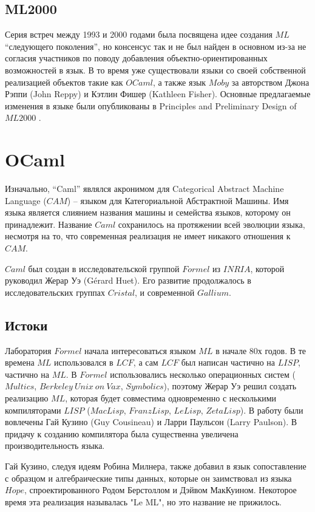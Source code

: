 \documentclass[14pt]{matmex-diploma-custom}
\begin{document}
\subsection{ML2000}
Серия встреч между 1993 и 2000 годами была посвящена идее создания $M\!L$ “следующего поколения”, но консенсус так и не был найден в основном из-за не согласия участников по поводу добавления объектно-ориентированных возможностей в язык. В то время уже существовали языки со своей собственной реализацией объектов такие как $OCaml$, а также язык $Moby$ за авторством Джона Рэппи (John Reppy) и Кэтлин Фишер (Kathleen Fisher). Основные предлагаемые изменения в языке были опубликованы в Principles and Preliminary Design of $ML2000$ \cite{ML2000}. 


\section{OCaml}
Изначально, “Caml” являлся акронимом для Categorical Abstract Machine Language ($CAM$) -- языком для Категориальной Абстрактной Машины. Имя языка является слиянием названия машины и семейства языков, которому он принадлежит. Название $Caml$ сохранилось на протяжении всей эволюции языка, несмотря на то, что современная реализация не имеет никакого отношения к $CAM$.

$Caml$ был создан в исследовательской группой $Formel$ из $INRIA$, которой руководил Жерар Уэ (Gérard Huet). Его развитие продолжалось в исследовательских группах $Cristal$, и современной $Gallium$.

\subsection{Истоки}
Лаборатория $Formel$ начала интересоваться языком $M\!L$ в начале 80х годов. В те времена $M\!L$ использовался в $LCF$, а сам $LCF$ был написан частично на $LISP$, частично на $M\!L$. В $Formel$ использовались несколько операционных систем ($Multics$, $Berkeley\ Unix\ on\ Vax$, $Symbolics$), поэтому Жерар Уэ решил создать реализацию $M\!L$, которая будет совместима одновременно с несколькими компиляторами $LISP$ ($MacLisp$, $FranzLisp$, $LeLisp$, $ZetaLisp$). В работу были вовлечены Гай Кузино (Guy Cousineau) и Ларри Паульсон (Larry Paulson). В придачу к созданию компилятора была существенна увеличена производительность языка.

Гай Кузино, следуя идеям Робина Милнера, также добавил в язык сопоставление с образцом и алгебраические типы данных, которые он заимствовал из языка $Hope$, спроектированного Родом Берстоллом и Дэйвом МакКуином. Некоторое время эта реализация называлась "Le ML", но это название не прижилось. 
\end{document}
